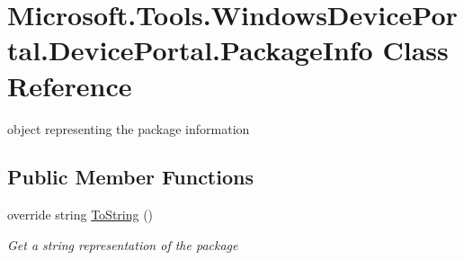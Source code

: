 \hypertarget{class_microsoft_1_1_tools_1_1_windows_device_portal_1_1_device_portal_1_1_package_info}{}\section{Microsoft.\+Tools.\+Windows\+Device\+Portal.\+Device\+Portal.\+Package\+Info Class Reference}
\label{class_microsoft_1_1_tools_1_1_windows_device_portal_1_1_device_portal_1_1_package_info}


object representing the package information  


\subsection*{Public Member Functions}
\begin{DoxyCompactItemize}
\item 
override string \hyperlink{class_microsoft_1_1_tools_1_1_windows_device_portal_1_1_device_portal_1_1_package_info_a4a72f6081c2279048094ddc769d9c2a1}{To\+String} ()
\begin{DoxyCompactList}\small\item\em Get a string representation of the package \end{DoxyCompactList}\end{DoxyCompactItemize}
